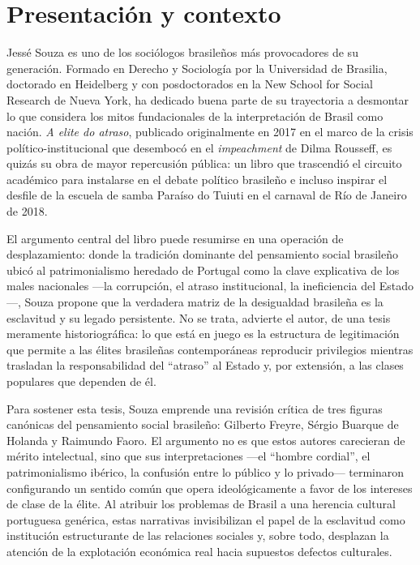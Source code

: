 \section{Presentación y contexto}
Jessé Souza es uno de los sociólogos brasileños más provocadores de su generación. Formado en Derecho y Sociología por la Universidad de Brasilia, doctorado en Heidelberg y con posdoctorados en la New School for Social Research de Nueva York, ha dedicado buena parte de su trayectoria a desmontar lo que considera los mitos fundacionales de la interpretación de Brasil como nación. \textit{A elite do atraso}, publicado originalmente en 2017 en el marco de la crisis político-institucional que desembocó en el \textit{impeachment} de Dilma Rousseff, es quizás su obra de mayor repercusión pública: un libro que trascendió el circuito académico para instalarse en el debate político brasileño e incluso inspirar el desfile de la escuela de samba Paraíso do Tuiuti en el carnaval de Río de Janeiro de 2018.

El argumento central del libro puede resumirse en una operación de desplazamiento: donde la tradición dominante del pensamiento social brasileño ubicó al patrimonialismo heredado de Portugal como la clave explicativa de los males nacionales —la corrupción, el atraso institucional, la ineficiencia del Estado—, Souza propone que la verdadera matriz de la desigualdad brasileña es la esclavitud y su legado persistente. No se trata, advierte el autor, de una tesis meramente historiográfica: lo que está en juego es la estructura de legitimación que permite a las élites brasileñas contemporáneas reproducir privilegios mientras trasladan la responsabilidad del “atraso” al Estado y, por extensión, a las clases populares que dependen de él.

Para sostener esta tesis, Souza emprende una revisión crítica de tres figuras canónicas del pensamiento social brasileño: Gilberto Freyre, Sérgio Buarque de Holanda y Raimundo Faoro. El argumento no es que estos autores carecieran de mérito intelectual, sino que sus interpretaciones —el “hombre cordial”, el patrimonialismo ibérico, la confusión entre lo público y lo privado— terminaron configurando un sentido común que opera ideológicamente a favor de los intereses de clase de la élite. Al atribuir los problemas de Brasil a una herencia cultural portuguesa genérica, estas narrativas invisibilizan el papel de la esclavitud como institución estructurante de las relaciones sociales y, sobre todo, desplazan la atención de la explotación económica real hacia supuestos defectos culturales.

